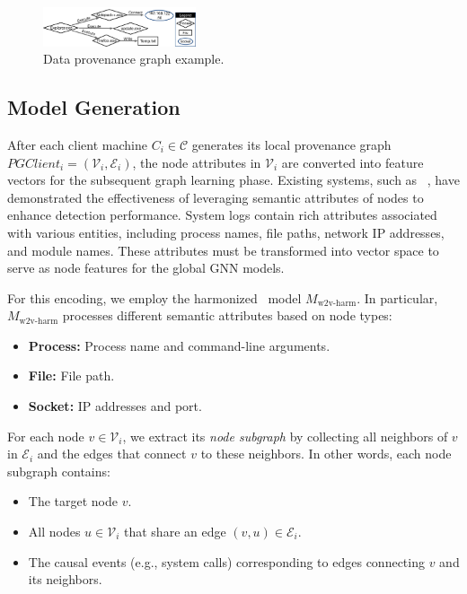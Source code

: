 \begin{figure}[t!]
  \centering
  \includegraphics[width=0.4\textwidth]{fig/provexp.pdf}
  \caption{Data provenance graph example.}
  \label{provexp}
  \vspace{-3ex}
\end{figure}


\subsection{\wordvec Model Generation}
\label{sub:word2vec:model}

After each client machine \(C_i\in \mathcal{C}\) generates its local provenance graph \(PGClient_{i} = (\mathcal{V}_i, \mathcal{E}_i)\), the node attributes in \(\mathcal{V}_i\) are converted into feature vectors for the subsequent graph learning phase. Existing systems, such as \flash~\cite{flash2024}, have demonstrated the effectiveness of leveraging semantic attributes of nodes to enhance detection performance. System logs contain rich attributes associated with various entities, including process names, file paths, network IP addresses, and module names. These attributes must be transformed into vector space to serve as node features for the global GNN models.

For this encoding, we employ the harmonized \wordvec~model \(M_{\text{w2v-harm}}\). In particular, \(M_{\text{w2v-harm}}\) processes different semantic attributes based on node types:
\begin{itemize}
    \item \textbf{Process:} Process name and command-line arguments.
    \item \textbf{File:} File path.
    \item \textbf{Socket:} IP addresses and port.
\end{itemize}

For each node \(v \in \mathcal{V}_i\), we extract its \emph{node subgraph} by collecting all neighbors of \(v\) in \(\mathcal{E}_i\) and the edges that connect \(v\) to these neighbors. In other words, each node subgraph contains:
\begin{itemize}
    \item The target node \(v\).
    \item All nodes \(u \in \mathcal{V}_i\) that share an edge \((v, u) \in \mathcal{E}_i\).
    \item The causal events (e.g., system calls) corresponding to edges connecting \(v\) and its neighbors.
\end{itemize}

